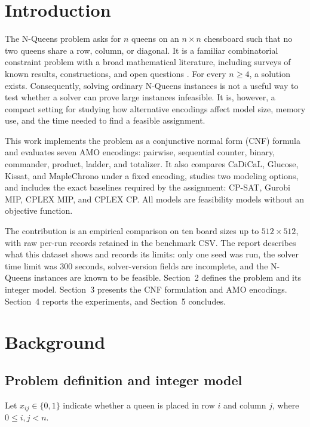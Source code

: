 \documentclass[a4paper,fleqn]{cas-sc}
\begin{document}
\maketitle

\section{Introduction}
The N-Queens problem asks for $n$ queens on an $n\times n$ chessboard such that no two queens share a row, column, or diagonal. It is a familiar combinatorial constraint problem with a broad mathematical literature, including surveys of known results, constructions, and open questions \cite{BellStevens2009}. For every $n\geq4$, a solution exists. Consequently, solving ordinary N-Queens instances is not a useful way to test whether a solver can prove large instances infeasible. It is, however, a compact setting for studying how alternative encodings affect model size, memory use, and the time needed to find a feasible assignment.

This work implements the problem as a conjunctive normal form (CNF) formula and evaluates seven AMO encodings: pairwise, sequential counter, binary, commander, product, ladder, and totalizer. It also compares CaDiCaL, Glucose, Kissat, and MapleChrono under a fixed encoding, studies two modeling options, and includes the exact baselines required by the assignment: CP-SAT, Gurobi MIP, CPLEX MIP, and CPLEX CP. All models are feasibility models without an objective function.

The contribution is an empirical comparison on ten board sizes up to $512\times512$, with raw per-run records retained in the benchmark CSV. The report describes what this dataset shows and records its limits: only one seed was run, the solver time limit was 300 seconds, solver-version fields are incomplete, and the N-Queens instances are known to be feasible. Section~2 defines the problem and its integer model. Section~3 presents the CNF formulation and AMO encodings. Section~4 reports the experiments, and Section~5 concludes.

\section{Background}
\subsection{Problem definition and integer model}
Let $x_{ij}\in\{0,1\}$ indicate whether a queen is placed in row $i$ and column $j$, where $0\leq i,j<n$.
\end{document}
